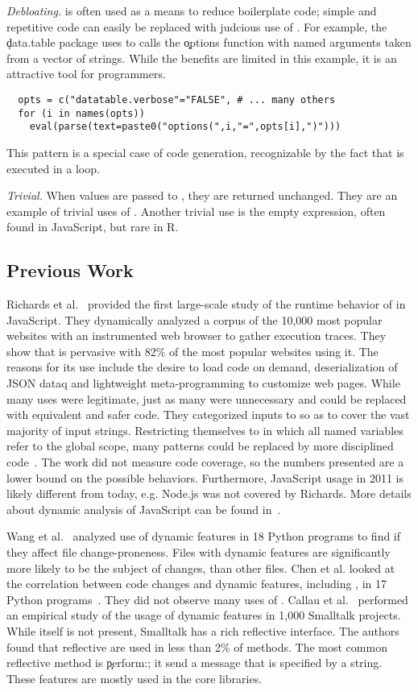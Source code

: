 \documentclass[acmsmall]{acmart}
\newcommand{\mypara}[1]{\medskip\noindent\emph{#1}\xspace}
\begin{document}
\mypara{Debloating.} \Eval is often used as a means to reduce
boilerplate code; simple and repetitive code can easily be replaced
with judcious use of \eval. For example, the \c{data.table} package
uses \eval to calls the \c{options} function with named arguments
taken from a vector of strings. While the benefits are limited in this
example, it is an attractive tool for programmers.
\begin{lstlisting}
  opts = c("datatable.verbose"="FALSE", # ... many others
  for (i in names(opts))
    eval(parse(text=paste0("options(",i,"=",opts[i],")")))
\end{lstlisting}
This pattern is a special case of code generation, recognizable by the
fact that \eval is executed in a loop.

\mypara{Trivial.} When values are passed to \eval, they are returned
unchanged. They are an example of trivial uses of \eval. Another
trivial use is the empty expression, often found in JavaScript, but
rare in R.


\subsection{Previous Work}

Richards et al.~\cite{ecoop11} provided the first large-scale study of
the runtime behavior of \eval in JavaScript. They dynamically analyzed
a corpus of the 10,000 most popular websites with an instrumented web
browser to gather execution traces. They show that \eval is pervasive
with 82\% of the most popular websites using it. The reasons for its
use include the desire to load code on demand, deserialization of JSON
dataq and lightweight meta-programming to customize web pages. While
many uses were legitimate, just as many were unnecessary and could be
replaced with equivalent and safer code. They categorized inputs to
\eval so as to cover the vast majority of input strings. Restricting
themselves to \eval in which all named variables refer to the global
scope, many patterns could be replaced by more disciplined
code~\cite{oopsla12b, moller12}. The work did not measure code
coverage, so the numbers presented are a lower bound on the possible
behaviors. Furthermore, JavaScript usage in 2011 is likely different
from today, e.g. Node.js was not covered by Richards. More details
about dynamic analysis of JavaScript can be found in~\cite{liang}.

Wang et al.~\cite{wang} analyzed use of dynamic features in 18 Python
programs to find if they affect file change-proneness. Files with
dynamic features are significantly more likely to be the subject of
changes, than other files. Chen et al. looked at the correlation
between code changes and dynamic features, including \eval, in 17
Python programs~\cite{chen}. They did not observe many uses of \eval.
Callau et al.~\cite{oscar} performed an empirical study of the usage
of dynamic features in 1,000 Smalltalk projects. While \eval itself is
not present, Smalltalk has a rich reflective interface. The authors
found that reflective are used in less than 2\% of methods. The most
common reflective method is \c{perform:}; it send a message that is
specified by a string. These features are mostly used in the core
libraries.
\end{document}
